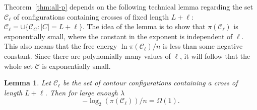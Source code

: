 \documentclass[letterpaper,english,numberwithinsect]{amsart}
\newtheorem{lemma}{Lemma}[section]
\newcommand{\cC}{\mathcal{C}}
\newcommand{\union}{\cup}
\begin{document}
Theorem~\ref{thm:all-p} depends on the following technical lemma 
regarding the set $\cC_{\ell}$ of configurations 
containing crosses of fixed length $L + \ell$:
$\cC_{\ell} = \union \{\cC_C : |C| = L + \ell \} $. 
The idea of the lemma is to show that $\pi(\cC_{\ell})$ is exponentially small, 
where the constant in the exponent is independent of $\ell$. 
This also means that {the free energy} $\ln\pi(\cC_{\ell})/n$ is less than
some negative constant. 
Since there are polynomially many values of $\ell$, 
it will follow that the whole set $\cC$ is exponentially small.

\begin{lemma}\label{lem:piOmegaL1}
Let $\cC_{\ell}$ be the set of contour configurations containing a cross of length $L + \ell$. 
Then for large enough $\lambda$ 
\begin{equation}\label{eqn:piOmega0L}
- \log_2(\pi(\cC_{\ell}))/n = \Omega(1).
\end{equation}
\end{lemma}
\end{document}
